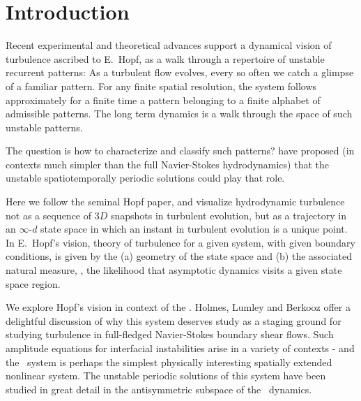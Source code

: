 %

\section{Introduction}

%
Recent experimental and theoretical advances
support a dynamical vision
of turbulence ascribed to E.~Hopf, as a walk through
a repertoire of unstable recurrent patterns:
As a turbulent flow evolves,
every so often we catch a glimpse of a familiar pattern.
For any finite  spatial resolution,
the system follows approximately for a finite time 
a pattern belonging to a 
{ finite alphabet}
of admissible patterns.
The long term dynamics is
a {  walk through the space of such unstable patterns}.

The question is how to characterize and classify such patterns?
 have proposed (in contexts
much simpler than the full Navier-Stokes hydrodynamics) 
that the unstable spatiotemporally periodic
solutions could play that role.

Here we follow the seminal Hopf paper, and  visualize
hydrodynamic turbulence not as  a sequence of 
$3D$  snapshots in turbulent evolution,
but as a trajectory in an 
 $\infty$-$d$ state space in which an
instant in turbulent evolution is
a { unique} point. In E.~Hopf's vision, 
theory of turbulence for a given system, with given boundary conditions,
is given by the
(a) geometry of the state space and (b) the associated natural measure, 
\ie,
the likelihood that asymptotic dynamics visits a given state space region.

We explore Hopf's vision in context of
the \KSe{}.
Holmes, Lumley
and Berkooz offer a delightful discussion of why this system
deserves study as a staging ground for studying turbulence in 
full-fledged Navier-Stokes boundary shear flows. 
Such 
amplitude equations for interfacial instabilities arise in a variety
of contexts - and 
the \KS\ system is perhaps the
simplest physically interesting spatially extended nonlinear system.
The unstable periodic solutions of
this system have been studied in great detail%
in the antisymmetric subspace of the \KS\ dynamics.


